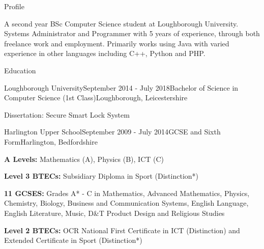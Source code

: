 \documentclass{resume} %
\begin{document}

\begin {rSection}{Profile}

A second year BSc Computer Science student at Loughborough University. Systems Administrator and Programmer with 5 years of experience, through both freelance work and employment. Primarily works using Java with varied experience in other languages including C++, Python and PHP.

\end{rSection}


\begin{rSection}{Education}

\begin{rSubsection}{Loughborough University}{September 2014 - July 2018}{Bachelor of Science in Computer Science (1st Class)}{Loughborough, Leicestershire}
\item Dissertation: Secure Smart Lock System
\end{rSubsection}

\begin{rSubsection}{Harlington Upper School}{September 2009 - July 2014}{GCSE and Sixth Form}{Harlington, Bedfordshire}
\item \textbf{A Levels: } Mathematics (A), Physics (B), ICT (C)
\item \textbf{Level 3 BTECs: } Subsidiary Diploma in Sport (Distinction*) \smallskip \smallskip
\item \textbf{11 GCSES: } Grades A* - C in Mathematics, Advanced Mathematics, Physics, Chemistry, Biology, Business and Communication Systems, English Language, English Literature, Music, D\&T Product Design and Religious Studies
\item \textbf{Level 2 BTECs: } OCR National First Certificate in ICT (Distinction) and Extended Certificate in Sport (Distinction*)
\end{rSubsection}
\end{rSection}

\end{document}
